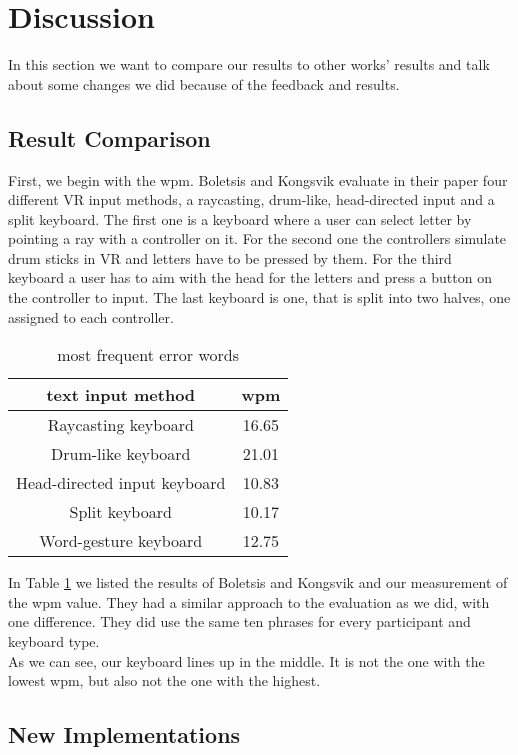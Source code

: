 \section{Discussion}
In this section we want to compare our results to other works' results and talk about some changes we did because of the feedback and results.

\subsection{Result Comparison}
First, we begin with the wpm. Boletsis and Kongsvik \cite{Boletsis2019ControllerbasedTT} evaluate in their paper four different VR input methods, a raycasting, drum-like, head-directed input and a split keyboard. The first one is a keyboard where a user can select letter by pointing a ray with a controller on it. For the second one the controllers simulate drum sticks in VR and letters have to be pressed by them. For the third keyboard a user has to aim with the head for the letters and press a button on the controller to input. The last keyboard is one, that is split into two halves, one assigned to each controller. 
\begin{table}[ht!]
    \centering
    \caption{most frequent error words}
    \begin{tabular}{cc} \toprule
        text input method&wpm\\ \midrule
        Raycasting keyboard& 16.65\\
        Drum-like keyboard& 21.01\\
        Head-directed input keyboard& 10.83\\
        Split keyboard& 10.17\\
        Word-gesture keyboard& 12.75\\
        \bottomrule
    \end{tabular}
    \label{tab:wpm_compare}
\end{table}

In Table \ref{tab:wpm_compare} we listed the results of Boletsis and Kongsvik \cite{Boletsis2019ControllerbasedTT} and our measurement of the wpm value. They had a similar approach to the evaluation as we did, with one difference. They did use the same ten phrases for every participant and keyboard type.\\
As we can see, our keyboard lines up in the middle. It is not the one with the lowest wpm, but also not the one with the highest.

\subsection{New Implementations}